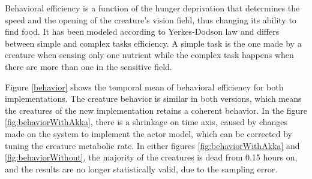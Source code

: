 \documentclass[runningheads]{llncs}
\begin{document}
Behavioral efficiency is a function of the hunger deprivation that determines the speed and the opening of the creature's vision field, thus changing its ability to find food. It has been modeled according to Yerkes-Dodson law \cite{Yerkes1908} and differs between simple and complex tasks efficiency. A simple task is the one made by a creature when sensing only one nutrient while the complex task happens when there are more than one in the sensitive field. 

 Figure \ref{behavior} shows the temporal mean of behavioral efficiency for both implementations. The creature behavior is similar in both versions, which means the creatures of the new implementation retains a coherent behavior. In the figure \ref{fig:behaviorWithAkka}, there is a shrinkage on time axis, caused by changes made on the system to implement the actor model, which can be corrected by tuning the creature metabolic rate. In either figures \ref{fig:behaviorWithAkka} and \ref{fig:behaviorWithout}, the majority of the creatures is dead from 0.15 hours on, and the results are no longer statistically valid, due to the sampling error.
 \newpage
\end{document}
